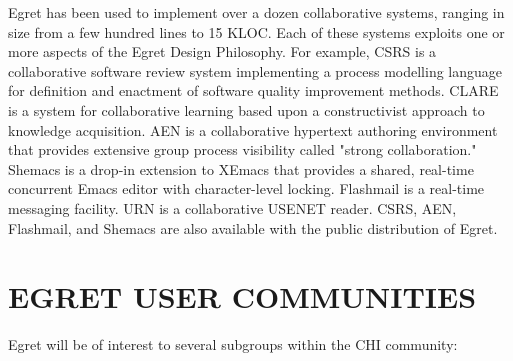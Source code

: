 Egret has been used to implement over a dozen collaborative systems,
ranging in size from a few hundred lines to 15 KLOC.  Each of these systems
exploits one or more aspects of the Egret Design Philosophy. For example,
CSRS is a collaborative software review system implementing a process
modelling language for definition and enactment of software quality
improvement methods.  CLARE is a system for collaborative learning based
upon a constructivist approach to knowledge acquisition. AEN is a
collaborative hypertext authoring environment that provides extensive group
process visibility called "strong collaboration."  Shemacs is a drop-in
extension to XEmacs that provides a shared, real-time concurrent Emacs
editor with character-level locking. Flashmail is a real-time messaging
facility.  URN is a collaborative USENET reader.  CSRS, AEN, Flashmail, and
Shemacs are also available with the public distribution of Egret.

\section{EGRET USER COMMUNITIES}

Egret will be of interest to several subgroups within the CHI community:

